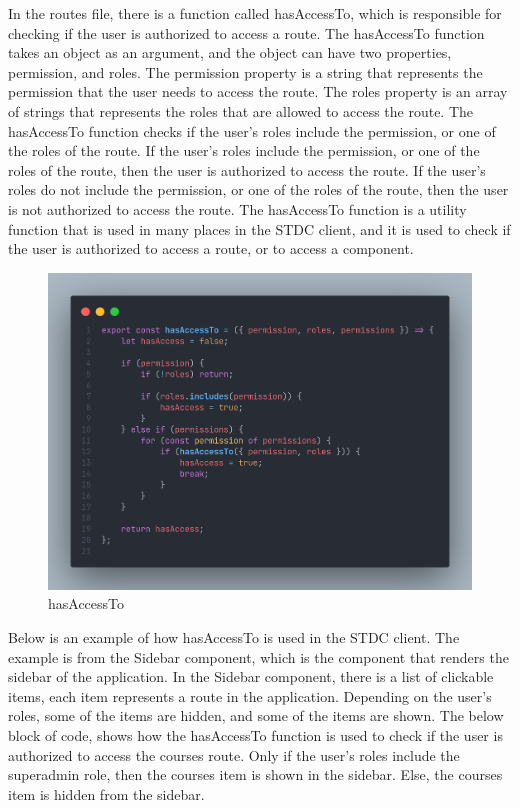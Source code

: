 \begin{justify}
        \vspace{0.25cm}
        \newendline In the routes file, there is a function called hasAccessTo, which is responsible for checking if the user is authorized to access a route. The hasAccessTo function takes an object as an argument, and the object can have two properties, permission, and roles. The permission property is a string that represents the permission that the user needs to access the route. The roles property is an array of strings that represents the roles that are allowed to access the route. The hasAccessTo function checks if the user's roles include the permission, or one of the roles of the route. If the user's roles include the permission, or one of the roles of the route, then the user is authorized to access the route. If the user's roles do not include the permission, or one of the roles of the route, then the user is not authorized to access the route. The hasAccessTo function is a utility function that is used in many places in the STDC client, and it is used to check if the user is authorized to access a route, or to access a component.

        \begin{figure}[H]
            \centerline{\includegraphics[width=150mm,scale=1]{figures/implementation_and_testing/implementation/frontend/hasAccessTo.png}}
            \caption{hasAccessTo}
        \end{figure}

        \vspace{0.25cm}
        \newendline Below is an example of how hasAccessTo is used in the STDC client. The example is from the Sidebar component, which is the component that renders the sidebar of the application. In the Sidebar component, there is a list of clickable items, each item represents a route in the application. Depending on the user's roles, some of the items are hidden, and some of the items are shown. The below block of code, shows how the hasAccessTo function is used to check if the user is authorized to access the courses route. Only if the user's roles include the superadmin role, then the courses item is shown in the sidebar. Else, the courses item is hidden from the sidebar.


\end{justify}
